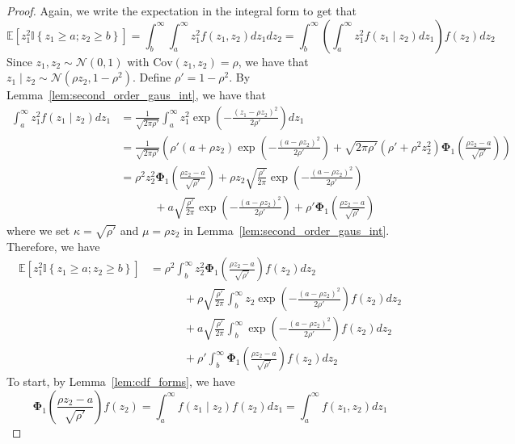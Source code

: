 \documentclass[10pt]{article} %
\theoremstyle{definition}
\theoremstyle{plain}
\newcommand{\paren}[1]{\left(#1\right)}
\newcommand{\indy}[1]{\mathbb{I}\left\{#1\right\}}
\providecommand{\E}{\mathbb{E}}
\begin{document}
\begin{proof}
    Again, we write the expectation in the integral form to get that
    \[
        \E\left[z_1^2\indy{z_1\geq a; z_2\geq b}\right] = \int_b^\infty\int_a^\infty z_1^2f\paren{z_1, z_2}dz_1dz_2 = \int_b^\infty\paren{\int_a^\infty z_1^2f\paren{z_1\mid z_2}dz_1}f\paren{z_2}dz_2
    \]
    Since $z_1, z_2\sim\mathcal{N}\paren{0, 1}$ with $\text{Cov}\paren{z_1, z_2} = \rho$, we have that $z_1\mid z_2 \sim\mathcal{N}\paren{\rho z_2, 1-\rho^2}$. Define $\rho' = 1-\rho^2$. By Lemma~\ref{lem:second_order_gaus_int}, we have that
    \begin{align*}
        \int_a^\infty z_1^2f\paren{z_1\mid z_2}dz_1 & = \frac{1}{\sqrt{2\pi\rho'}}\int_a^\infty z_1^2\exp\paren{-\frac{\paren{z_1-\rho z_2}^2}{2\rho'}}dz_1\\
        & = \frac{1}{\sqrt{2\pi\rho'}}\paren{\rho'\paren{a+\rho z_2}\exp\paren{-\frac{\paren{a-\rho z_2}^2}{2\rho'}} + \sqrt{2\pi\rho'}\paren{\rho'+\rho^2z_2^2}\bm{\Phi}_1\paren{\frac{\rho z_2-a}{\sqrt{\rho'}}}}\\
        & = \rho^2z_2^2\bm{\Phi}_1\paren{\frac{\rho z_2-a}{\sqrt{\rho'}}} + \rho z_2\sqrt{\frac{\rho'}{2\pi}}\exp\paren{-\frac{\paren{a-\rho z_2}^2}{2\rho'}}\\
        & \quad\quad\quad + a\sqrt{\frac{\rho'}{2\pi}}\exp\paren{-\frac{\paren{a-\rho z_2}^2}{2\rho'}} + \rho'\bm{\Phi}_1\paren{\frac{\rho z_2-a}{\sqrt{\rho'}}}
    \end{align*}
    where we set $\kappa=\sqrt{\rho'}$ and $\mu = \rho z_2$ in Lemma~\ref{lem:second_order_gaus_int}. Therefore, we have
    \begin{align*}
        \E\left[z_1^2\indy{z_1\geq a; z_2\geq b}\right] & = \rho^2\int_b^\infty z_2^2\bm{\Phi}_1\paren{\frac{\rho z_2-a}{\sqrt{\rho'}}}f\paren{z_2}dz_2\\
        &\quad\quad\quad + \rho\sqrt{\frac{\rho'}{2\pi}}\int_b^\infty z_2\exp\paren{-\frac{\paren{a-\rho z_2}^2}{2\rho'}}f\paren{z_2}dz_2\\
        & \quad\quad\quad +a\sqrt{\frac{\rho'}{2\pi}}\int_b^\infty\exp\paren{-\frac{\paren{a-\rho z_2}^2}{2\rho'}}f\paren{z_2}dz_2\\
        &\quad\quad\quad + \rho'\int_b^\infty\bm{\Phi}_1\paren{\frac{\rho z_2-a}{\sqrt{\rho'}}}f\paren{z_2}dz_2
    \end{align*}
    To start, by Lemma~\ref{lem:cdf_forms}, we have
    \[
        \bm{\Phi}_1\paren{\frac{\rho z_2-a}{\sqrt{\rho'}}}f\paren{z_2} = \int_a^\infty f\paren{z_1\mid z_2}f\paren{z_2}dz_1 = \int_a^\infty f\paren{z_1,z_2}dz_1
\]
\end{proof}
\end{document}
